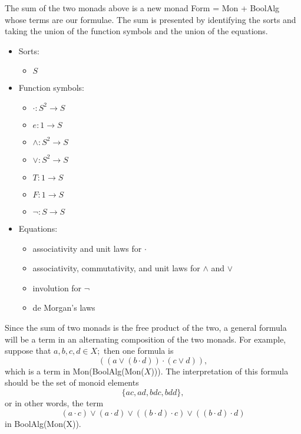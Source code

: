 \documentclass{article}
\newcommand{\maps}{\colon}
\begin{document}
The sum of the two monads above is a new monad Form = Mon + BoolAlg whose terms are our formulae.  The sum is presented by identifying the sorts and taking the union of the function symbols and the union of the equations.
\begin{center}
  \begin{itemize}
    \item Sorts:
    \begin{itemize}
      \item $S$
    \end{itemize}
    \item Function symbols:
    \begin{itemize}
      \item $\cdot\maps S^2 \to S$
      \item $e\maps 1 \to S$
      \item $\land\maps S^2 \to S$
      \item $\lor\maps S^2 \to S$
      \item $T\maps 1 \to S$
      \item $F\maps 1 \to S$
      \item $\neg\maps S \to S$
    \end{itemize}
    \item Equations:
    \begin{itemize}
      \item associativity and unit laws for $\cdot$
      \item associativity, commutativity, and unit laws for $\land$ and $\lor$
      \item involution for $\neg$
      \item de Morgan's laws
    \end{itemize}
  \end{itemize}
\end{center}
Since the sum of two monads is the free product of the two, a general formula will be a term in an alternating composition of the two monads.  For example, suppose that $a, b, c, d \in X;$ then one formula is
\[ (({a}\lor{(b \cdot d)}) \cdot ({c}\lor{d})), \]
which is a term in Mon(BoolAlg(Mon($X$))).  The interpretation of this formula should be the set of monoid elements
\[ \{ ac, ad, bdc, bdd \}, \]
or in other words, the term
\[ (a \cdot c) \lor (a \cdot d) \lor ((b \cdot d) \cdot c) \lor ((b \cdot d) \cdot d) \]
in BoolAlg(Mon(X)).
\end{document}
